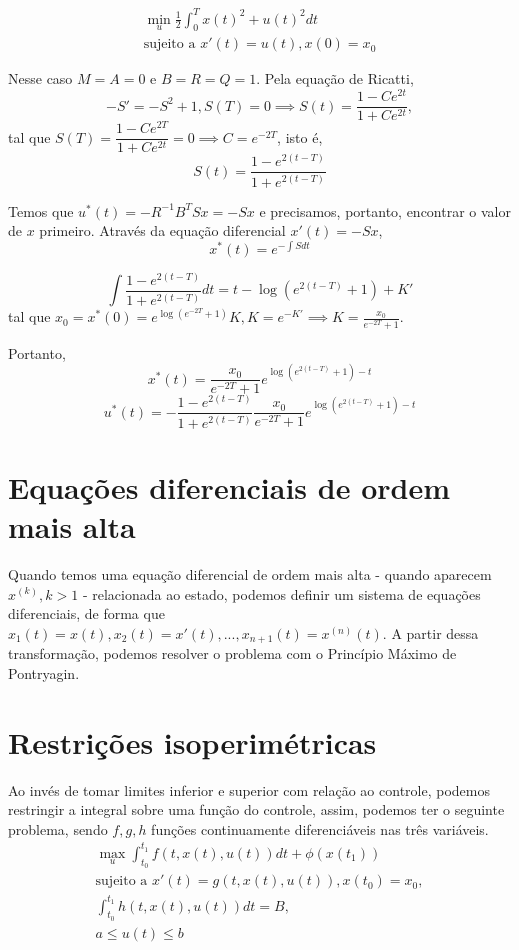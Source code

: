 \begin{example}
    \begin{gather*}
        \min_u \frac{1}{2}\int_0^T x(t)^2 + u(t)^2 dt \\
        \text{sujeito a  }x'(t) = u(t), x(0) = x_0
    \end{gather*}
\end{example}

Nesse caso $M = A = 0$ e $B = R = Q = 1$. Pela equação de Ricatti, 
$$
-S' = - S^2 + 1, S(T) = 0 \implies S(t) = \frac{1 - Ce^{2t}}{1 + Ce^{2t}},
$$
tal que $S(T) = \dfrac{1 - Ce^{2T}}{1 + Ce^{2t}} = 0 \implies C =
e^{-2T}$, isto é, 
$$
S(t) = \frac{1 - e^{2(t-T)}}{1 + e^{2(t-T)}}
$$

Temos que $u^*(t) = - R^{-1}B^TSx = -Sx$ e precisamos, portanto, encontrar o
valor de $x$ primeiro. Através da equação diferencial $x'(t) = -Sx$, 
$$x^*(t) = e^{-\int S dt}$$

$$
\int  \frac{1 - e^{2(t-T)}}{1 + e^{2(t-T)}}dt = t - \log(e^{2(t-T)} + 1) + K'
$$
tal que $x_0 = x^*(0) = e^{\log(e^{-2T} + 1)}K, K = e^{-K'} \implies K =
\frac{x_0}{e^{-2T} + 1}$. 

Portanto, 
$$
x^*(t) = \frac{x_0}{e^{-2T} + 1}e^{\log(e^{2(t-T)} + 1) - t}
$$
$$
u^*(t) = -\frac{1 - e^{2(t-T)}}{1 + e^{2(t-T)}}\frac{x_0}{e^{-2T} + 1}e^{\log(e^{2(t-T)} + 1) - t}
$$


\section{Equações diferenciais de ordem mais alta}

Quando temos uma equação diferencial de ordem mais alta - quando aparecem
$x^{(k)}, k > 1$ - relacionada ao estado,
podemos definir um sistema de equações diferenciais, de forma que $x_1(t) = x(t), x_2(t) = x'(t), ...,
x_{n+1}(t) = x^{(n)}(t)$. A partir dessa transformação, podemos resolver o
problema com o Princípio Máximo de Pontryagin. 

\section{Restrições isoperimétricas}

Ao invés de tomar limites inferior e superior com relação ao controle, podemos
restringir a integral sobre uma função do controle, assim, podemos ter o
seguinte problema, sendo $f, g, h$ funções continuamente diferenciáveis nas
três variáveis. 
\begin{gather*}
    \max_u \int_{t_0}^{t_1} f(t, x(t), u(t)) dt + \phi(x(t_1)) \\ 
    \text{sujeito a  }x'(t) = g(t, x(t), u(t)), x(t_0) = x_0, \\
    \int_{t_0}^{t_1} h(t, x(t), u(t)) dt = B, \\
    a \le u(t) \le b
\end{gather*}

